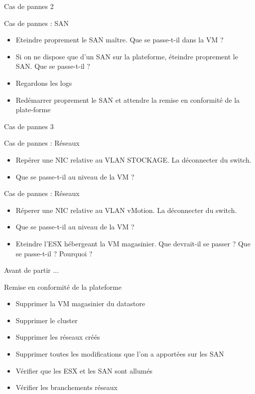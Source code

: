 \begin{frame}{Cas de pannes 2}
\begin{block}{Cas de pannes : SAN}
\begin{itemize}
\item Eteindre proprement le SAN maître. Que se passe-t-il dans la VM ?
\item Si on ne dispose que d'un SAN sur la plateforme, éteindre proprement le SAN. Que se passe-t-il ?
\item Regardons les logs
\item Redémarrer proprement le SAN et attendre la remise en conformité de la plate-forme
\end{itemize}
\end{block}
\end{frame}

\begin{frame}{Cas de pannes 3}
\begin{block}{Cas de pannes : Réseaux}
\begin{itemize}
\item Repérer une NIC relative au VLAN STOCKAGE. La déconnecter du switch.
\item Que se passe-t-il au niveau de la VM ?
\end{itemize}
\end{block}

\begin{block}{Cas de pannes : Réseaux}
\begin{itemize}
\item Réperer une NIC relative au VLAN vMotion. La déconnecter du switch.
\item Que se passe-t-il au niveau de la VM ? 
\item Eteindre l'ESX hébergeant la VM magasinier. Que devrait-il se passer ? Que se passe-t-il ? Pourquoi ?
\end{itemize}
\end{block}
\end{frame}

\begin{frame}{Avant de partir ...}
\begin{block}{Remise en conformité de la plateforme}
\begin{itemize}
\item Supprimer la VM magasinier du datastore
\item Supprimer le cluster
\item Supprimer les réseaux créés
\item Supprimer toutes les modifications que l'on a apportées sur les SAN
\item Vérifier que les ESX et les SAN sont allumés
\item Vérifier les branchements réseaux
\end{itemize}
\end{block}
\end{frame}